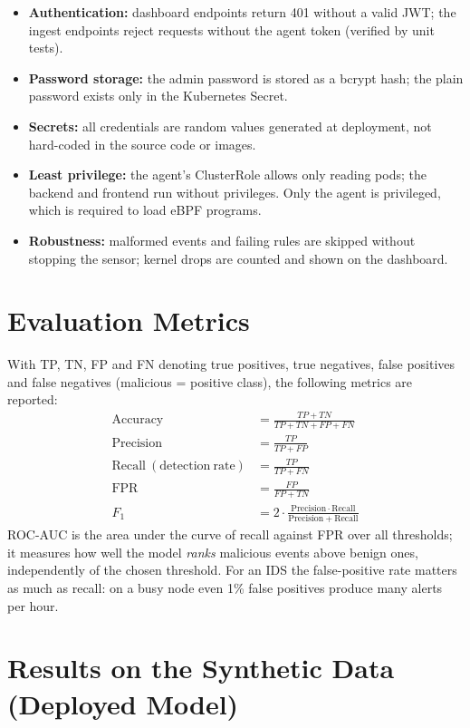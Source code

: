 \begin{itemize}
    \item \textbf{Authentication:} dashboard endpoints return 401 without a valid JWT; the
          ingest endpoints reject requests without the agent token (verified by unit tests).
    \item \textbf{Password storage:} the admin password is stored as a bcrypt hash; the
          plain password exists only in the Kubernetes Secret.
    \item \textbf{Secrets:} all credentials are random values generated at deployment, not
          hard-coded in the source code or images.
    \item \textbf{Least privilege:} the agent's ClusterRole allows only reading pods; the
          backend and frontend run without privileges. Only the agent is privileged, which
          is required to load eBPF programs.
    \item \textbf{Robustness:} malformed events and failing rules are skipped without
          stopping the sensor; kernel drops are counted and shown on the dashboard.
\end{itemize}

\section{Evaluation Metrics}

With TP, TN, FP and FN denoting true positives, true negatives, false positives and
false negatives (malicious = positive class), the following metrics are reported:
\begin{align}
\mathrm{Accuracy} &= \frac{TP + TN}{TP + TN + FP + FN} \\
\mathrm{Precision} &= \frac{TP}{TP + FP} \\
\mathrm{Recall\ (detection\ rate)} &= \frac{TP}{TP + FN} \\
\mathrm{FPR} &= \frac{FP}{FP + TN} \\
F_1 &= 2 \cdot \frac{\mathrm{Precision} \cdot \mathrm{Recall}}{\mathrm{Precision} + \mathrm{Recall}}
\end{align}
ROC-AUC is the area under the curve of recall against FPR over all thresholds; it
measures how well the model \emph{ranks} malicious events above benign ones,
independently of the chosen threshold. For an IDS the false-positive rate matters as
much as recall: on a busy node even 1\% false positives produce many alerts per hour.

\section{Results on the Synthetic Data (Deployed Model)}

